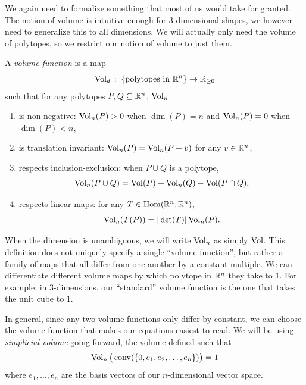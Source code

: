 \documentclass[12pt,oneside]{../../sfsuthesis}
\begin{document}
We again need to formalize something that most of us would take for granted.
The notion of volume is intuitive enough for 3-dimensional shapes, we however need to generalize this to all dimensions.
We will actually only need the volume of polytopes, so we restrict our notion of volume to just them.
\begin{definition}
    A \emph{volume function} is a map
    \[
        \operatorname{Vol}_d\,:\; \{\text{polytopes in \( \mathbb{R}^n \)}\} \to \mathbb{R}_{\geq 0}
    \]
    such that for any polytopes \( P,Q \subseteq \mathbb{R}^n \), \( \operatorname{Vol}_n \)
    \begin{enumerate}
        \item{is non-negative:} \( \operatorname{Vol}_n(P) > 0 \) when \( \dim(P) = n \) and \( \operatorname{Vol}_n(P) = 0 \) when \( \dim(P) < n \),
        \item{is translation invariant:} \( \operatorname{Vol}_n(P) =  \operatorname{Vol}_n(P+v) \) for any \( v \in \mathbb{R}^n \),
        \item{respects inclusion-exclusion:} when \( P \cup Q \) is a polytope,
        \[
            \operatorname{Vol}_n(P \cup Q) = \operatorname{Vol}(P) + \operatorname{Vol}_n(Q) - \operatorname{Vol}(P \cap Q),
        \]
        \item{respects linear maps:} for any \( T \in \operatorname{Hom}(\mathbb{R}^n, \mathbb{R}^n) \),
        \[
            \operatorname{Vol}_n(T(P)) = |\det(T)|\operatorname{Vol}_n(P).
        \]
    \end{enumerate}
\end{definition}
When the dimension is unambiguous, we will write \( \operatorname{Vol}_n \) as simply \( \operatorname{Vol} \).
This definition does not uniquely specify a single ``volume function'', but rather a family of maps that all differ from one another by a constant multiple.
We can differentiate different volume maps by which polytope in \( \mathbb{R}^n \) they take to \( 1 \).
For example, in \( 3 \)-dimensions, our ``standard'' volume function is the one that takes the unit cube to \( 1 \).

In general, since any two volume functions only differ by constant, we can choose the volume function that makes our equations easiest to read.
We will be using \textit{simplicial volume} going forward, the volume defined such that
\[
    \operatorname{Vol}_n \big(\operatorname{conv}(\{0, e_1, e_2, \dots, e_n\})\big) = 1
\]
where \( e_1, \dots, e_n \) are the basis vectors of our \( n \)-dimensional vector space.
\end{document}
